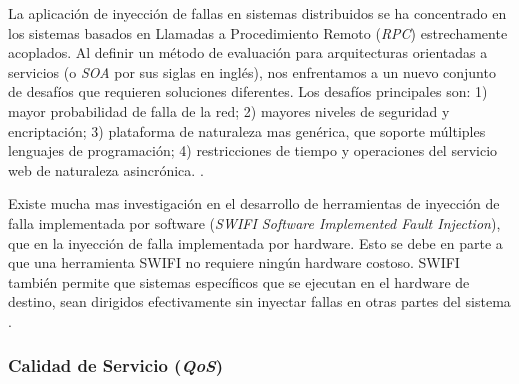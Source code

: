 \par La aplicación de inyección de fallas en sistemas distribuidos se ha concentrado en los sistemas basados en Llamadas a Procedimiento Remoto (\textit{RPC}) estrechamente acoplados. Al definir un método de evaluación para arquitecturas orientadas a servicios (o \textit{SOA} por sus siglas en inglés), nos enfrentamos a un nuevo conjunto de desafíos que requieren soluciones diferentes. Los desafíos principales son: 1) mayor probabilidad de falla de la red; 2) mayores niveles de seguridad y encriptación; 3) plataforma de naturaleza mas genérica, que soporte múltiples lenguajes de programación; 4) restricciones de tiempo y operaciones del servicio web de naturaleza asincrónica. \cite{LIB19}.\\

\par Existe mucha mas investigación en el desarrollo de herramientas de inyección de falla implementada por software (\textit{SWIFI Software Implemented Fault Injection}), que en la inyección de falla implementada por hardware. Esto se debe en parte a que una herramienta SWIFI no requiere ningún hardware costoso. SWIFI también permite que sistemas específicos que se ejecutan en el hardware de destino, sean dirigidos efectivamente sin inyectar fallas en otras partes del sistema \cite{LIB19}.\\

\subsubsection{Calidad de Servicio (\textit{QoS})}

